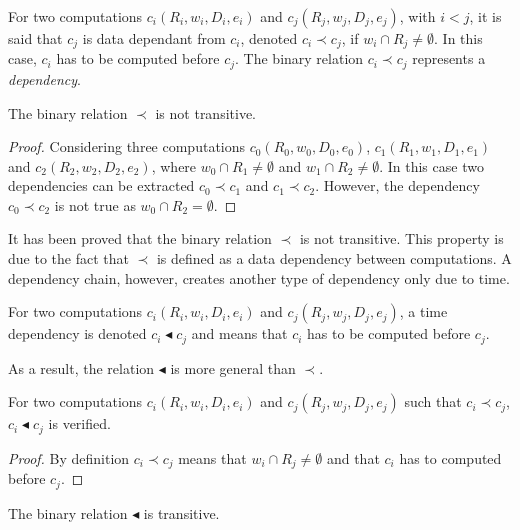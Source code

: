 \begin{mydef}
For two computations $c_i(R_i,w_i,D_i,e_i)$ and $c_j(R_j,w_j,D_j,e_j)$, with $i < j$, it is said that $c_j$ is data dependant from $c_i$, denoted $c_i\prec c_j$, if $w_i \cap R_j \neq \emptyset$. In this case, $c_i$ has to be computed before $c_j$. The binary relation $c_i\prec c_j$ represents a \textit{dependency}.
\end{mydef}

\begin{myprop}
The binary relation $\prec$ is not transitive. 
\end{myprop}

\begin{proof}
Considering three computations $c_0(R_0,w_0,D_0,e_0)$, $c_1(R_1,w_1,D_1,e_1)$ and $c_2(R_2,w_2,D_2,e_2)$, where $w_0\cap R_1 \neq \emptyset$ and $w_1\cap R_2 \neq \emptyset$. In this case two dependencies can be extracted $c_0 \prec c_1$ and $c_1 \prec c_2$. However, the dependency $c_0 \prec c_2$ is not true as $w_0\cap R_2 = \emptyset$.
\end{proof}

It has been proved that the binary relation $\prec$ is not transitive. This property is due to the fact that $\prec$ is defined as a data dependency between computations. A dependency chain, however, creates another type of dependency only due to time.

\begin{mydef}
For two computations $c_i(R_i,w_i,D_i,e_i)$ and $c_j(R_j,w_j,D_j,e_j)$, a time dependency is denoted $c_i \blacktriangleleft c_j$ and means that $c_i$ has to be computed before $c_j$.
\end{mydef}

As a result, the relation $\blacktriangleleft$ is more general than $\prec$.

\begin{myprop}
For two computations $c_i(R_i,w_i,D_i,e_i)$ and $c_j(R_j,w_j,D_j,e_j)$ such that $c_i \prec c_j$, $c_i \blacktriangleleft c_j$ is verified.
\end{myprop}

\begin{proof}
By definition $c_i \prec c_j$ means that $w_i\cap R_j \neq \emptyset$ and that $c_i$ has to computed before $c_j$. %
\end{proof}

\begin{myprop}
The binary relation $\blacktriangleleft$ is transitive. 
\end{myprop}

